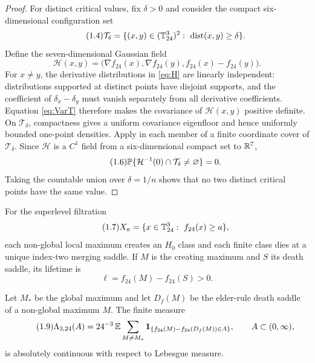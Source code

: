 \begin{proof}
For distinct critical values, fix $\delta>0$ and consider the compact six-dimensional configuration set
\begin{equation}\tag{1.4}
\mathcal T_\delta=\{(x,y)\in(\T_{24}^3)^2:\ \dist(x,y)\ge\delta\}.
\end{equation}
Define the seven-dimensional Gaussian field
\begin{equation}\tag{1.5}\label{eq:H}
\mathcal H(x,y)=\bigl(\nabla f_{24}(x),\nabla f_{24}(y),f_{24}(x)-f_{24}(y)\bigr).
\end{equation}
For $x\ne y$, the derivative distributions in \eqref{eq:H} are linearly independent: distributions supported at distinct points have disjoint supports, and the coefficient of $\delta_x-\delta_y$ must vanish separately from all derivative coefficients. Equation \eqref{eq:VarT} therefore makes the covariance of $\mathcal H(x,y)$ positive definite. On $\mathcal T_\delta$, compactness gives a uniform covariance eigenfloor and hence uniformly bounded one-point densities. Apply \cite[Lemma~11.2.10]{AdlerTaylor} in each member of a finite coordinate cover of $\mathcal T_\delta$. Since $\mathcal H$ is a $C^1$ field from a six-dimensional compact set to $\mathbb R^7$,
\begin{equation}\tag{1.6}
\mathbb P\{\mathcal H^{-1}(0)\cap\mathcal T_\delta\ne\varnothing\}=0 .
\end{equation}
Taking the countable union over $\delta=1/n$ shows that no two distinct critical points have the same value.
\end{proof}

For the superlevel filtration
\begin{equation}\tag{1.7}
X_a=\{x\in\mathbb T_{24}^3:\ f_{24}(x)\ge a\},
\end{equation}
each non-global local maximum creates an $H_0$ class and each finite class dies at a unique index-two merging saddle. If $M$ is the creating maximum and $S$ its death saddle, its lifetime is
\begin{equation}\tag{1.8}\label{eq:lifetime}
\ell=f_{24}(M)-f_{24}(S)>0 .
\end{equation}

\begin{proposition}\label{prop:density}
Let $M_*$ be the global maximum and let $D_f(M)$ be the elder-rule death saddle of a non-global maximum $M$. The finite measure
\begin{equation}\tag{1.9}\label{eq:Lambda}
\Lambda_{3,24}(A)=24^{-3}\,\mathbb E\sum_{M\ne M_*}\mathbf 1_{\{f_{24}(M)-f_{24}(D_f(M))\in A\}},\qquad A\subset(0,\infty),
\end{equation}
is absolutely continuous with respect to Lebesgue measure.
\end{proposition}

